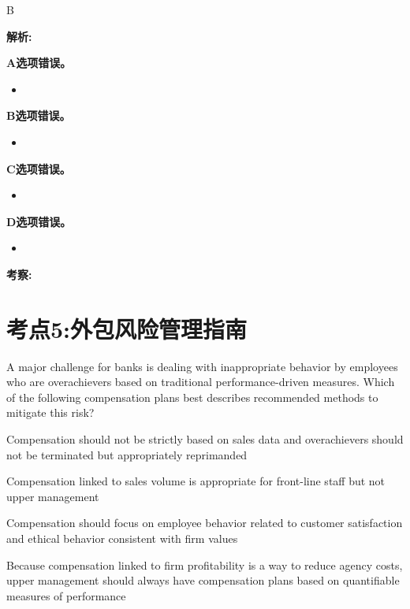 \documentclass{article}
\newcounter{question} %
\newenvironment{explanation}
{\textbf{解析:}\par}
{\par}
\newcommand{\checklist}[1]{
    \textbf{考察:} #1 \par %
    \addcontentsline{toc}{subsection}{题号\thequestion 考察: #1} %
    \vspace{2em} %
}
\begin{document}
\begin{choices}

        \item 
\end{choices}


\begin{correctanswer}
    B
\end{correctanswer}

\begin{explanation}
    \textbf{A选项错误。}
    \begin{itemize}
        \item 
    \end{itemize}
    
    \textbf{B选项错误。}
    \begin{itemize}
        \item 
    \end{itemize}
    
    \textbf{C选项错误。}
    \begin{itemize}
        \item 
    \end{itemize}
    
    \textbf{D选项错误。}
    \begin{itemize}
        \item 
    \end{itemize}
\end{explanation}
\checklist{}



\newpage


\section{考点5:外包风险管理指南}
\setcounter{question}{0}
\begin{question}
    A major challenge for banks is dealing with inappropriate behavior by employees who are overachievers based on traditional performance-driven measures. Which of the following compensation plans best describes recommended methods to mitigate this risk?
\end{question}

\begin{choices}
    \item Compensation should not be strictly based on sales data and overachievers should not be terminated but appropriately reprimanded
    \item Compensation linked to sales volume is appropriate for front-line staff but not upper management
    \item Compensation should focus on employee behavior related to customer satisfaction and ethical behavior consistent with firm values
    \item Because compensation linked to firm profitability is a way to reduce agency costs, upper management should always have compensation plans based on quantifiable measures of performance
\end{choices}
\end{document}
